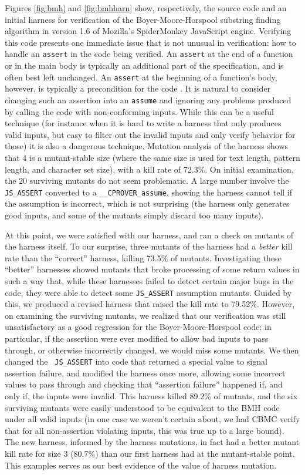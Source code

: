 \documentclass[conference]{IEEEtran}
\begin{document}
Figures \ref{fig:bmh} and \ref{fig:bmhharn} show, respectively, the
source code and an initial harness for verification of the
Boyer-Moore-Horspool substring finding algorithm \cite{BMH,CFV13} in
version 1.6 of Mozilla's SpiderMonkey JavaScript engine.  Verifying
this code presents one immediate issue that is not unusual in
verification: how to handle an {\tt assert} in the code being
verified.  An {\tt assert} at the end of a function or in the main
body is typically an additional part of the specification, and is
often best left unchanged.  An {\tt assert} at the beginning of a
function's body, however, is typically a precondition for the code \cite{CFV13}.  It is natural to consider changing such an assertion into
an {\tt assume} and ignoring any problems produced by calling the code
with non-conforming inputs.  While this can be a useful technique (for
instance when it is hard to write a harness that only produces valid
inputs, but easy to filter out the invalid inputs and only verify
behavior for those) it is also a dangerous technique.  Mutation
analysis of the harness shows that 4 is a mutant-stable size (where
the same size is used for text length, pattern length, and character
set size), with a kill rate of 72.3\%.  On initial examination, the 20
surviving mutants do not seem problematic.  A large number involve the
{\tt JS\_ASSERT} converted to a {\tt \_\_CPROVER\_assume}, showing the
harness cannot tell if the assumption is incorrect, which is not
surprising (the harness only generates good inputs, and some of the
mutants simply discard too many inputs).

At this point, we were satisfied with our harness, and ran a check on
mutants of the harness itself.  To our surprise, three mutants of the
harness had a \emph{better} kill rate than the ``correct'' harness,
killing 73.5\% of mutants.  Investigating these ``better'' harnesses
showed mutants that broke processing of some return values in such a
way that, while these harnesses failed to detect certain major bugs
in the code, they were able to detect some {\tt JS\_ASSERT} assumption mutants.  Guided
by this, we produced a revised harness that raised the kill rate to
79.52\%.  However, on examining the surviving mutants, we realized
that our verification was still unsatisfactory as a good regression for the
Boyer-Moore-Horspool code:  in particular, if the assertion were ever
modified to allow bad inputs to pass through, or otherwise incorrectly
changed, we would miss some mutants.  We then changed the {\tt
  JS\_ASSERT} into code that returned a special value to signal
assertion failure, and modified the harness once more,
allowing some incorrect values to pass through and checking that
``assertion failure'' happened if, and only if, the inputs were invalid.
This harness killed 89.2\% of mutants, and the six surviving mutants
were easily understood to be equivalent to the BMH code under all
valid inputs (in one case we weren't certain about, we had CBMC verify
that for all non-assertion violating inputs, this was true up to a
large bound).  The new harness, informed by the harness mutations, in
fact had a better mutant kill rate for size 3 (80.7\%) than our first harness
had at the mutant-stable point.  This examples serves as our best
evidence of the value of harness mutation.
\end{document}
